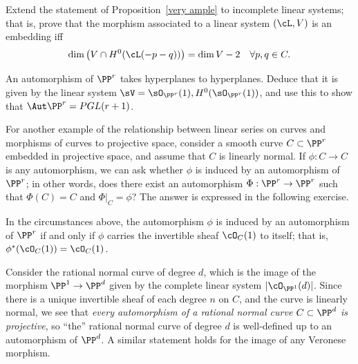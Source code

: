 \begin{exercise}
Extend the statement of Proposition~\ref{very ample} to incomplete linear systems; that is, prove that the morphism associated to a linear system $(\cL, V)$ is an embedding iff
$$
\dim\big( V \cap H^0(\cL(-p-q))\big) = \dim V - 2 \quad \forall p, q \in C.
$$
\end{exercise}

\begin{exercise}
An automorphism of $\PP^r$ takes hyperplanes to hyperplanes. Deduce that it is given by the linear system
$\sV = \sO_{\PP^r}(1), H^0(\sO_{\PP^r}(1))$, and use this to show that $\Aut \PP^r = PGL(r+1)$. 
\end{exercise}

For another example of the relationship between linear series on curves and morphisms of curves to projective space, consider a smooth curve $C \subset \PP^r$ embedded in projective space, and assume that $C$ is linearly normal. If $\phi : C \to C$ is any automorphism, we can ask whether $\phi$ is induced by an automorphism of $\PP^r$; in other words, does there exist an automorphism $\Phi : \PP^r \to \PP^r$ such that $\Phi(C) = C$ and $\Phi|_C = \phi$? The answer is expressed in the following exercise.

\begin{exercise}\label{projective automorphism}
In the circumstances above, the automorphism $\phi$ is induced by an automorphism of $\PP^r$ if and only if $\phi$ carries the invertible sheaf $\cO_{C}(1)$ to itself; that is, $\phi^*(\cO_{C}(1)) = \cO_{C}(1)$.
\end{exercise}

\begin{example}
Consider the rational normal curve of degree $d$, which is the image of the morphism $\PP^1\to \PP^d$ given by the complete linear system $|\cO_{\PP^1}(d)|$. Since there is a unique invertible sheaf of each degree $n$ on $C$, and the curve is linearly normal, we see that \emph{every automorphism of a rational normal curve $C \subset \PP^d$  is projective}, so ``the'' rational normal curve of degree $d$ is well-defined up to an automorphism of $\PP^d$.  A similar statement holds
for the image of any Veronese morphism.
\end{example}



